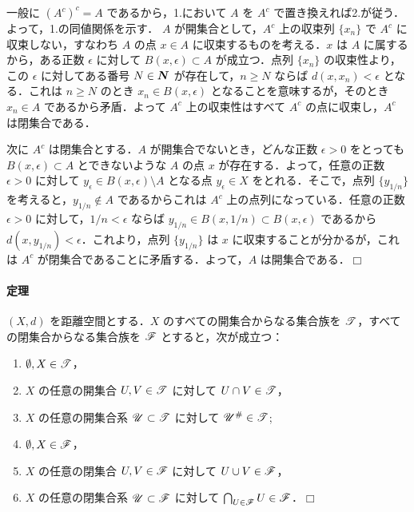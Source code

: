 \documentclass[pandoc,base=10pt,b5j,precisetext]{bxjsarticle}
\providecommand{\tightlist}{%
  \setlength{\itemsep}{0pt}\setlength{\parskip}{0pt}}
\let\oldparagraph\paragraph
\renewcommand{\paragraph}[1]{\oldparagraph{#1}\mbox{}}
\def\lt{<}
\begin{document}
一般に \((A^c)^c = A\) であるから，1.において \(A\) を \(A^c\)
で置き換えれば2.が従う．よって，1.の同値関係を示す． \(A\)
が開集合として，\(A^c\) 上の収束列 \(\{ x_n \}\) で \(A^c\)
に収束しない，すなわち \(A\) の点 \(x \in A\)
に収束するものを考える．\(x\) は \(A\) に属するから，ある正数
\(\epsilon\) に対して \(B(x, \epsilon) \subset A\) が成立つ．点列
\(\{ x_n \}\) の収束性より，この \(\epsilon\) に対してある番号
\(N \in \boldsymbol{N}\) が存在して，\(n \ge N\) ならば
\(d(x, x_n) \lt \epsilon\) となる．これは \(n \ge N\) のとき
\(x_n \in B(x, \epsilon)\) となることを意味するが，そのとき
\(x_n \in A\) であるから矛盾．よって \(A^c\) 上の収束性はすべて \(A^c\)
の点に収束し，\(A^c\) は閉集合である．

次に \(A^c\) は閉集合とする．\(A\) が開集合でないとき，どんな正数
\(\epsilon > 0\) をとっても \(B(x, \epsilon) \subset A\)
とできないような \(A\) の点 \(x\) が存在する．よって，任意の正数
\(\epsilon > 0\) に対して \(y_\epsilon \in B(x, \epsilon) \setminus A\)
となる点 \(y_\epsilon \in X\) をとれる．そこで，点列 \(\{ y_{1/n} \}\)
を考えると，\(y_{1/n} \notin A\) であるからこれは \(A^c\)
上の点列になっている．任意の正数 \(\epsilon > 0\)
に対して，\(1/n \lt \epsilon\) ならば
\(y_{1/n} \in B(x, 1/n) \subset B(x, \epsilon)\) であるから
\(d(x, y_{1/n}) \lt \epsilon\)．これより，点列 \(\{ y_{1/n} \}\) は
\(x\) に収束することが分かるが，これは \(A^c\)
が閉集合であることに矛盾する．よって，\(A\) は開集合である．\(\Box\)

\hypertarget{fundamental-properties-of-openness}{%
\paragraph{定理}\label{fundamental-properties-of-openness}}

\((X, d)\) を距離空間とする．\(X\) のすべての開集合からなる集合族を
\(\mathscr{T}\)，すべての閉集合からなる集合族を \(\mathscr{F}\)
とすると，次が成立つ：

\begin{enumerate}
\def\labelenumi{\roman{enumi})}
\tightlist
\item
  \(\emptyset, X \in \mathscr{T}\)，
\item
  \(X\) の任意の開集合 \(U, V \in \mathscr{T}\) に対して
  \(U \cap V \in \mathscr{T}\)，
\item
  \(X\) の任意の開集合系 \(\mathscr{U} \subset \mathscr{T}\) に対して
  \(\mathscr{U}^\# \in \mathscr{T}\);
\item
  \(\emptyset, X \in \mathscr{F}\)，
\item
  \(X\) の任意の閉集合 \(U, V \in \mathscr{F}\) に対して
  \(U \cup V \in \mathscr{F}\)，
\item
  \(X\) の任意の閉集合系 \(\mathscr{U} \subset \mathscr{F}\) に対して
  \(\bigcap_{ U \in \mathscr{F} } U \in \mathscr{F}\)．\(\Box\)
\end{enumerate}
\end{document}

